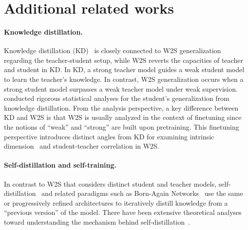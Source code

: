 \onecolumn
\clearpage
\appendix
\appendixpage  %
\hypersetup{linkcolor=black}
\startcontents[sections]

\hypersetup{linkcolor=hrefblue}
\glsresetall

\section{Additional related works}\label{apx:related_works}

\paragraph{Knowledge distillation.}
Knowledge distillation (KD)~\citep{hinton2015distilling,gou2021knowledge} is closely connected to W2S generalization regarding the teacher-student setup, while W2S reverts the capacities of teacher and student in KD. In KD, a strong teacher model guides a weak student model to learn the teacher's knowledge. In contrast, W2S generalization occurs when a strong student model surpasses a weak teacher model under weak supervision.
\citet{phuong2019towards,stanton2021does,ojha2023knowledge,nagarajan2023student,dong2024cluster,ildiz2024high} conducted rigorous statistical analyses for the student's generalization from knowledge distillation. 
From the analysis perspective, a key difference between KD and W2S is that W2S is usually analyzed in the context of finetuning since the notions of “weak” and “strong” are built upon pretraining. This finetuning perspective introduces distinct angles from KD for examining intrinsic dimension~\citep{li2018measuring} and student-teacher correlation in W2S. 

\paragraph{Self-distillation and self-training.}
In contrast to W2S that considers distinct student and teacher models, self-distillation~\citep{zhang2019your,zhang2021self} and related paradigms such as Born-Again Networks~\citep{furlanello2018born} use the same or progressively refined architectures to iteratively distill knowledge from a ``previous version'' of the model. There have been extensive theoretical analyses toward understanding the mechanism behind self-distillation~\citep{mobahi2020self,das2023understanding,borup2023self,pareek2024understanding}.

